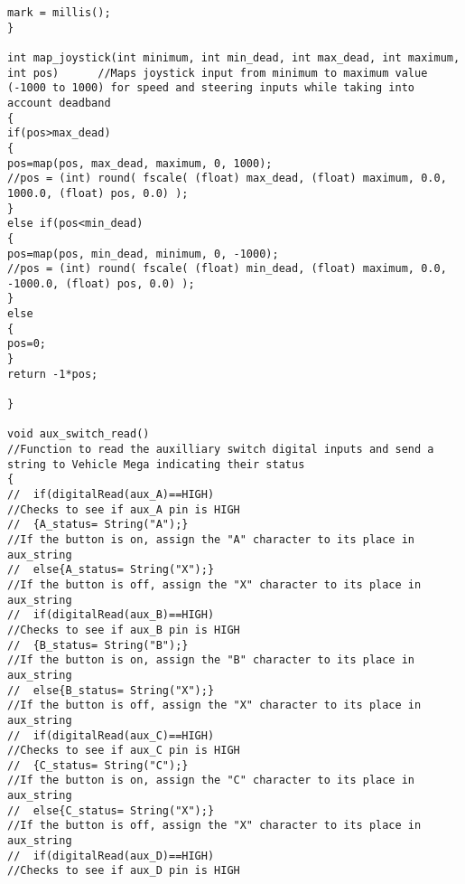 \begin{lstlisting}[breaklines=true,basicstyle=\tiny]
mark = millis();
}

int map_joystick(int minimum, int min_dead, int max_dead, int maximum, int pos)      //Maps joystick input from minimum to maximum value (-1000 to 1000) for speed and steering inputs while taking into account deadband 
{
if(pos>max_dead)                                                                   
{
pos=map(pos, max_dead, maximum, 0, 1000);
//pos = (int) round( fscale( (float) max_dead, (float) maximum, 0.0, 1000.0, (float) pos, 0.0) );
}
else if(pos<min_dead)
{
pos=map(pos, min_dead, minimum, 0, -1000);
//pos = (int) round( fscale( (float) min_dead, (float) maximum, 0.0, -1000.0, (float) pos, 0.0) );
}
else 
{
pos=0;
}
return -1*pos;

}

void aux_switch_read()                                                              //Function to read the auxilliary switch digital inputs and send a string to Vehicle Mega indicating their status
{
//  if(digitalRead(aux_A)==HIGH)                                                      //Checks to see if aux_A pin is HIGH
//  {A_status= String("A");}                                                          //If the button is on, assign the "A" character to its place in aux_string
//  else{A_status= String("X");}                                                      //If the button is off, assign the "X" character to its place in aux_string
//  if(digitalRead(aux_B)==HIGH)                                                      //Checks to see if aux_B pin is HIGH                                                 
//  {B_status= String("B");}                                                          //If the button is on, assign the "B" character to its place in aux_string
//  else{B_status= String("X");}                                                      //If the button is off, assign the "X" character to its place in aux_string
//  if(digitalRead(aux_C)==HIGH)                                                      //Checks to see if aux_C pin is HIGH                                                 
//  {C_status= String("C");}                                                          //If the button is on, assign the "C" character to its place in aux_string
//  else{C_status= String("X");}                                                      //If the button is off, assign the "X" character to its place in aux_string
//  if(digitalRead(aux_D)==HIGH)                                                      //Checks to see if aux_D pin is HIGH                                                 

\end{lstlisting}
